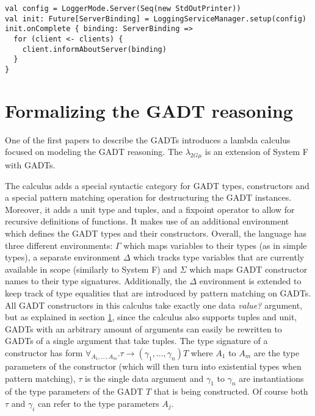 \begin{verbatim}
val config = LoggerMode.Server(Seq(new StdOutPrinter))
val init: Future[ServerBinding] = LoggingServiceManager.setup(config)
init.onComplete { binding: ServerBinding =>
  for (client <- clients) {
    client.informAboutServer(binding)
  }
}
\end{verbatim}

\section{Formalizing the GADT reasoning}

One of the first papers to describe the GADTs \cite{XiGRDT} introduces a lambda calculus focused on modeling the GADT reasoning. The $\lambda_{2G\mu}$ is an extension of System F \cite{girard_prot} with GADTs.

The calculus adds a special syntactic category for GADT types, constructors and a special pattern matching operation for destructuring the GADT instances. Moreover, it adds a unit type and tuples, and a fixpoint operator to allow for recursive definitions of functions. It makes use of an additional environment which defines the GADT types and their constructors. Overall, the language has three different environments: $\Gamma$ which maps variables to their types (as in simple types), a separate environment $\Delta$ which tracks type variables that are currently available in scope (similarly to System F) and $\Sigma$ which maps GADT constructor names to their type signatures. Additionally, the $\Delta$ environment is extended to keep track of type equalities that are introduced by pattern matching on GADTs. All GADT constructors in this calculus take exactly one data \textit{value?} argument, but as explained in section \ref{}, since the calculus also supports tuples and unit, GADTs with an arbitrary amount of arguments can easily be rewritten to GADTs of a single argument that take tuples. The type signature of a constructor has form $\forall_{A_1, ..., A_m}. \tau \to (\gamma_1, ..., \gamma_n) T$ where $A_1$ to $A_m$ are the type parameters of the constructor (which will then turn into existential types when pattern matching), $\tau$ is the single data argument and $\gamma_1$ to $\gamma_n$ are instantiations of the type parameters of the GADT $T$ that is being constructed. Of course both $\tau$ and $\gamma_i$ can refer to the type parameters $A_j$.


